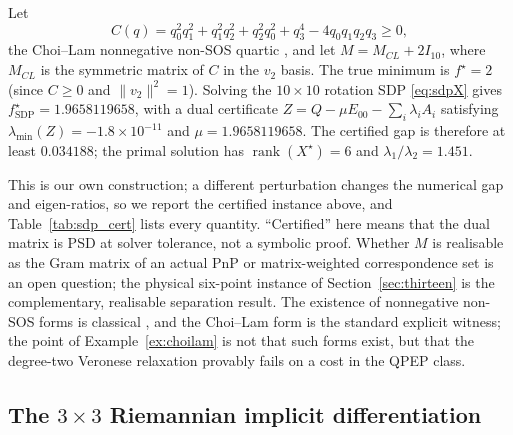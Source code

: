 \begin{example}\label{ex:choilam}
Let
\begin{equation}
C(q)=q_0^2q_1^2+q_1^2q_2^2+q_2^2q_0^2+q_3^4-4q_0q_1q_2q_3\ge0,
\label{eq:choilam}
\end{equation}
the Choi--Lam nonnegative non-SOS quartic \cite{choi1977extremal,choi1980zeros}, and let $M=M_{CL}+2I_{10}$, where $M_{CL}$ is the symmetric matrix of $C$ in the $v_2$ basis. The true minimum is $f^\star=2$ (since $C\ge0$ and $\|v_2\|^2=1$). Solving the $10\times10$ rotation SDP \eqref{eq:sdpX} gives $f^\star_{\mathrm{SDP}}=1.9658119658$, with a dual certificate $Z=Q-\mu E_{00}-\sum_i\lambda_iA_i$ satisfying $\lambda_{\min}(Z)=-1.8\times10^{-11}$ and $\mu=1.9658119658$. The certified gap is therefore at least $0.034188$; the primal solution has $\operatorname{rank}(X^\star)=6$ and $\lambda_1/\lambda_2=1.451$.
\end{example}

This is our own construction; a different perturbation changes the numerical gap and eigen-ratios, so we report the certified instance above, and Table~\ref{tab:sdp_cert} lists every quantity. ``Certified'' here means that the dual matrix is PSD at solver tolerance, not a symbolic proof. Whether $M$ is realisable as the Gram matrix of an actual PnP or matrix-weighted correspondence set is an open question; the physical six-point instance of Section~\ref{sec:thirteen} is the complementary, realisable separation result. The existence of nonnegative non-SOS forms is classical \cite{hilbert1888,blekherman2006}, and the Choi--Lam form is the standard explicit witness; the point of Example~\ref{ex:choilam} is not that such forms exist, but that the degree-two Veronese relaxation provably fails on a cost in the QPEP class.

\subsection{The \texorpdfstring{$3\times3$}{3x3} Riemannian implicit differentiation}\label{sec:implicit}

